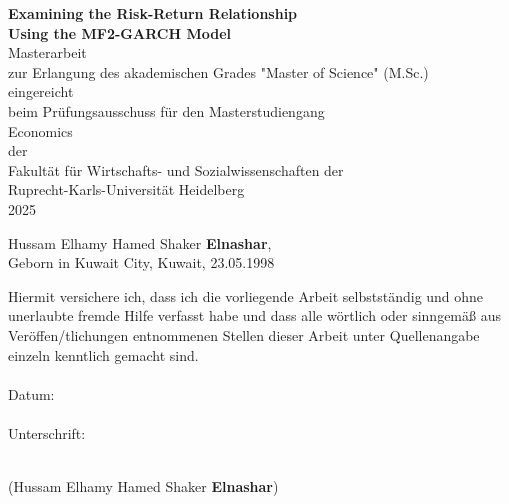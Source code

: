 \documentclass[12pt]{article}
\begin{document}
\renewcommand*\contentsname{Table of Contents}

\thispagestyle{empty}
\hspace{0pt}
\begin{center}
\vfill
\textbf{Examining the Risk-Return Relationship \\Using the MF2-GARCH Model}\\
\vspace{25mm}
Masterarbeit\\
zur Erlangung des akademischen Grades "Master of Science" (M.Sc.)\\
\vspace{5mm}
eingereicht\\
beim Prüfungsausschuss für den Masterstudiengang\\
\vspace{5mm}
Economics\\
\vspace{5mm}
der\\
Fakultät für Wirtschafts- und Sozialwissenschaften der\\
Ruprecht-Karls-Universität Heidelberg\\
\vspace{5mm}
2025\\
\vspace{5mm}
\end{center}
\vfill
Hussam Elhamy Hamed Shaker \textbf{Elnashar},\\ 
Geborn in Kuwait City, Kuwait, 23.05.1998
\hspace{0pt}

\newpage
\thispagestyle{empty}
\noindent Hiermit versichere ich, dass ich die vorliegende Arbeit selbstständig und ohne unerlaubte fremde Hilfe verfasst habe und dass alle wörtlich oder sinngemäß aus Veröffen\-/tlichungen entnommenen Stellen dieser Arbeit unter Quellenangabe einzeln kenntlich gemacht sind.\\\\
Datum:\\\\
Unterschrift:\\\\
\begin{center}
(Hussam Elhamy Hamed Shaker \textbf{Elnashar})
\end{center}

\newpage
\thispagestyle{empty}
\tableofcontents
\thispagestyle{empty}

\newpage
{}
\setcounter{page}{1}
\end{document}
